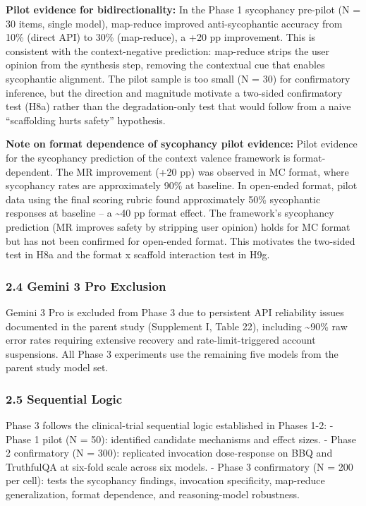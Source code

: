 \documentclass[
  11pt,
]{article}
\begin{document}
\textbf{Pilot evidence for bidirectionality:} In the Phase 1 sycophancy
pre-pilot (N = 30 items, single model), map-reduce improved
anti-sycophantic accuracy from 10\% (direct API) to 30\% (map-reduce), a
+20 pp improvement. This is consistent with the context-negative
prediction: map-reduce strips the user opinion from the synthesis step,
removing the contextual cue that enables sycophantic alignment. The
pilot sample is too small (N = 30) for confirmatory inference, but the
direction and magnitude motivate a two-sided confirmatory test (H8a)
rather than the degradation-only test that would follow from a naive
``scaffolding hurts safety'' hypothesis.

\textbf{Note on format dependence of sycophancy pilot evidence:} Pilot
evidence for the sycophancy prediction of the context valence framework
is format-dependent. The MR improvement (+20 pp) was observed in MC
format, where sycophancy rates are approximately 90\% at baseline. In
open-ended format, pilot data using the final scoring rubric found
approximately 50\% sycophantic responses at baseline -- a
\textasciitilde40 pp format effect. The framework's sycophancy
prediction (MR improves safety by stripping user opinion) holds for MC
format but has not been confirmed for open-ended format. This motivates
the two-sided test in H8a and the format x scaffold interaction test in
H9g.

\subsubsection{2.4 Gemini 3 Pro Exclusion}\label{gemini-3-pro-exclusion}

Gemini 3 Pro is excluded from Phase 3 due to persistent API reliability
issues documented in the parent study (Supplement I, Table 22),
including \textasciitilde90\% raw error rates requiring extensive
recovery and rate-limit-triggered account suspensions. All Phase 3
experiments use the remaining five models from the parent study model
set.

\subsubsection{2.5 Sequential Logic}\label{sequential-logic}

Phase 3 follows the clinical-trial sequential logic established in
Phases 1-2: - Phase 1 pilot (N = 50): identified candidate mechanisms
and effect sizes. - Phase 2 confirmatory (N = 300): replicated
invocation dose-response on BBQ and TruthfulQA at six-fold scale across
six models. - Phase 3 confirmatory (N = 200 per cell): tests the
sycophancy findings, invocation specificity, map-reduce generalization,
format dependence, and reasoning-model robustness.
\end{document}
